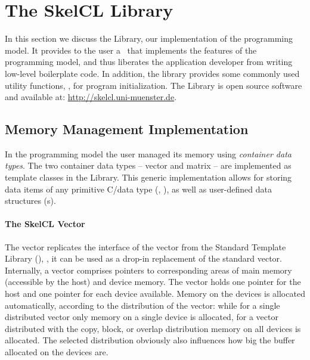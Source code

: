 \section{The SkelCL Library}
\label{section:skelcl-library}
In this section we discuss the \SkelCL Library, our implementation of the \SkelCL programming model.
It provides to the user a \Cpp~\API that implements the features of the \SkelCL programming model, and thus liberates the application developer from writing low-level boilerplate code.
In addition, the library provides some commonly used utility functions, \eg, for program initialization.
The \SkelCL Library is open source software and available at: \url{http://skelcl.uni-muenster.de}.

\subsection{Memory Management Implementation}
\label{section:skelcl-library:memory-management}
In the \SkelCL programming model the user managed its memory using \emph{container data types}.
The two container data types -- vector and matrix -- are implemented as template classes in the \SkelCL Library.
This generic implementation allows for storing data items of any primitive C/\Cpp data type (\eg, ), as well as user-defined data structures (s).

\paragraph{The SkelCL Vector}
The \SkelCL vector replicates the interface of the vector from the Standard Template Library (\STL), \ie, it can be used as a drop-in replacement of the standard vector.
Internally, a vector comprises pointers to corresponding areas of main memory (accessible by the host) and device memory.
The vector holds one pointer for the host and one pointer for each device available.
Memory on the devices is allocated automatically, according to the distribution of the vector:
while for a single distributed vector only memory on a single device is allocated, for a vector distributed with the copy, block, or overlap distribution memory on all devices is allocated.
The selected distribution obviously also influences how big the buffer allocated on the devices are.

